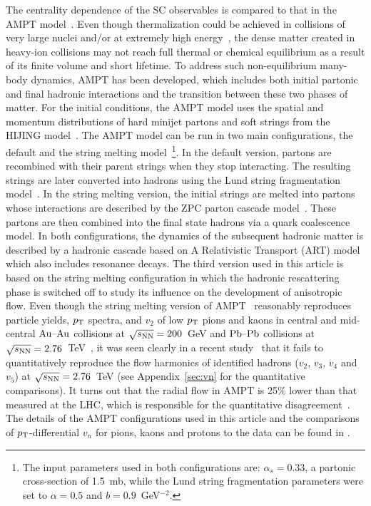 The centrality dependence of the SC observables is compared to that in the {AMPT} model~\cite{Zhang:1999bd,Lin:2000cx,Lin:2004en}.
Even though thermalization could be achieved in collisions of very large nuclei and/or at extremely high energy~\cite{Kurkela:2015qoa}, the dense matter created in heavy-ion collisions may not reach full thermal or chemical equilibrium as a result of its finite volume and short lifetime. To address such non-equilibrium many-body dynamics, AMPT has been developed, which includes both initial partonic and final hadronic interactions and the transition between these two phases of matter.
For the initial conditions, the AMPT model uses the spatial and momentum distributions of hard minijet partons and soft strings from the HIJING model~\cite{Wang:1991hta,Gyulassy:1994ew}.
The AMPT model can be run in two main configurations, the default and the string melting model~\footnote{The input parameters used in both configurations are: $\alpha_s = 0.33$, a partonic cross-section of 1.5~mb, while the Lund string fragmentation parameters were set to $\alpha = 0.5$ and $b = 0.9$~GeV$^{-2}$.}.
In the default version, partons are recombined with their parent strings when they stop interacting. The resulting strings are later converted into hadrons using the Lund string fragmentation model~\cite{Andersson:1986gw,NilssonAlmqvist:1986rx}. In the string melting version, the initial strings are melted into partons whose interactions are described by the ZPC parton cascade model~\cite{Zhang:1997ej}. These partons are then combined into the final state hadrons via a quark coalescence model. 
In both configurations, the dynamics of the subsequent hadronic matter is described by a hadronic cascade based on A Relativistic Transport (ART) model~\cite{Li:2001xh} which also includes resonance decays.
The third version used in this article is based on the string melting configuration in which the hadronic rescattering phase is switched off to study its influence on the development of anisotropic flow. 
Even though the string melting version of AMPT~\cite{Lin:2001zk,Lin:2004en} reasonably reproduces particle yields, $p_{\rm T}$ spectra, and $v_2$ of low $p_{\rm T}$ pions and kaons in central and mid-central $\textnormal{Au--Au}$ collisions at $\sqrt{s_{\textnormal{NN}}}=200$~GeV and $\textnormal{Pb--Pb}$ collisions at $\sqrt{s_{\textnormal{NN}}}=2.76$~TeV~\cite{Lin:2014tya}, it was seen clearly in a recent study~\cite{Adam:2016nfo} that it fails to quantitatively reproduce the flow harmonics of identified hadrons ($v_2$, $v_3$, $v_4$ and $v_5$) at $\sqrt{s_{\textnormal{NN}}}=2.76$~TeV (see Appendix~\ref{sec:vn} for the quantitative comparisons). It turns out that the radial flow in AMPT is 25\% lower than that measured at the LHC, which is responsible for the quantitative disagreement~\cite{Adam:2016nfo}. The details of the AMPT configurations used in this article and the comparisons of $p_{\rm T}$-differential $v_{n}$ for pions, kaons and protons to the data can be found in \cite{Adam:2016nfo}.

